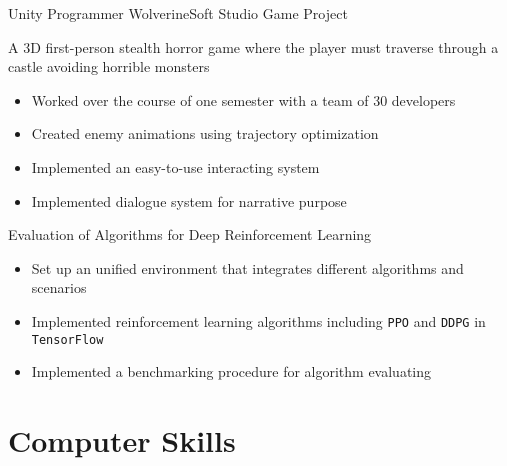 \documentclass[10pt, a4paper, sans]{moderncv}
\begin{document}
{Unity Programmer}
{WolverineSoft Studio Game Project}
{}{}
{A 3D first-person stealth horror game where the player must traverse through a castle avoiding horrible monsters
	\begin{itemize}
		\item Worked over the course of one semester with a team of 30 developers
		\item Created enemy animations using trajectory optimization
		\item Implemented an easy-to-use interacting system
		\item Implemented dialogue system for narrative purpose
	\end{itemize}
}

{{Evaluation of Algorithms for Deep Reinforcement Learning}
	\begin{itemize}
		\item Set up an unified environment that integrates different algorithms and scenarios
		\item Implemented reinforcement learning algorithms including \texttt{PPO} and \texttt{DDPG} in \texttt{TensorFlow}
		\item Implemented a benchmarking procedure for algorithm evaluating
	\end{itemize}
}


\section{Computer Skills}
\end{document}
